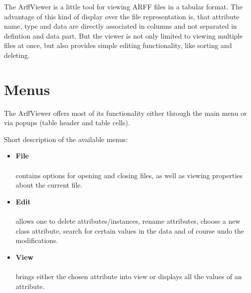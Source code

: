 %
%
%
%


The ArffViewer is a little tool for viewing ARFF files in a tabular format. The advantage of this kind of display over the file representation is, that attribute name, type and data are directly associated in columns and not separated in defintion and data part. But the viewer is not only limited to viewing multiple files at once, but also provides simple editing functionality, like sorting and deleting.

\begin{center}
\end{center}

\newpage
\section{Menus}
The ArffViewer offers most of its functionality either through the main menu or via popups (table header and table cells). 

Short description of the available menus:
\begin{itemize}
	\item \textbf{File} \\
		 \\
		contains options for opening and closing files, as well as viewing properties about the current file.
	\item \textbf{Edit} \\
		 \\
		allows one to delete attributes/instances, rename attributes, choose a new class attribute, search for certain values in the data and of course undo the modifications.
	\item \textbf{View} \\
		 \\
		brings either the chosen attribute into view or displays all the values of an attribute. 
\end{itemize}

